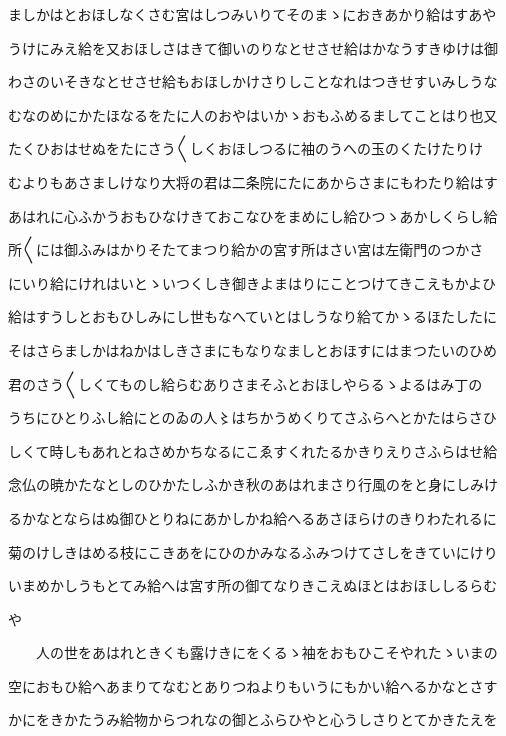 \documentclass[a4paper,11pt,landscape]{ltjtarticle}
\begin{document}
\par\medskip
ましかはとおほしなくさむ宮はしつみいりてそのまゝにおきあかり給はすあや
\par\medskip
うけにみえ給を又おほしさはきて御いのりなとせさせ給はかなうすきゆけは御
\par\medskip
わさのいそきなとせさせ給もおほしかけさりしことなれはつきせすいみしうな
\par\medskip
むなのめにかたほなるをたに人のおやはいかゝおもふめるましてことはり也又
\par\medskip
たくひおはせぬをたにさう〱しくおほしつるに袖のうへの玉のくたけたりけ
\par\medskip
むよりもあさましけなり大将の君は二条院にたにあからさまにもわたり給はす
\par\medskip
あはれに心ふかうおもひなけきておこなひをまめにし給ひつゝあかしくらし給
\par\medskip
所〱には御ふみはかりそたてまつり給かの宮す所はさい宮は左衛門のつかさ
\par\medskip
にいり給にけれはいとゝいつくしき御きよまはりにことつけてきこえもかよひ
\par\medskip
給はすうしとおもひしみにし世もなへていとはしうなり給てかゝるほたしたに
\par\medskip
そはさらましかはねかはしきさまにもなりなましとおほすにはまつたいのひめ
\par\medskip
君のさう〱しくてものし給らむありさまそふとおほしやらるゝよるはみ丁の
\par\medskip
うちにひとりふし給にとのゐの人〻はちかうめくりてさふらへとかたはらさひ
\par\medskip
しくて時しもあれとねさめかちなるにこゑすくれたるかきりえりさふらはせ給
\par\medskip
念仏の暁かたなとしのひかたしふかき秋のあはれまさり行風のをと身にしみけ
\par\medskip
るかなとならはぬ御ひとりねにあかしかね給へるあさほらけのきりわたれるに
\par\medskip
菊のけしきはめる枝にこきあをにひのかみなるふみつけてさしをきていにけり
\par\medskip
いまめかしうもとてみ給へは宮す所の御てなりきこえぬほとはおほししるらむ
\par\medskip
や
\par\medskip
　　人の世をあはれときくも露けきにをくるゝ袖をおもひこそやれたゝいまの
\par\medskip
空におもひ給へあまりてなむとありつねよりもいうにもかい給へるかなとさす
\par\medskip
かにをきかたうみ給物からつれなの御とふらひやと心うしさりとてかきたえを
\end{document}
